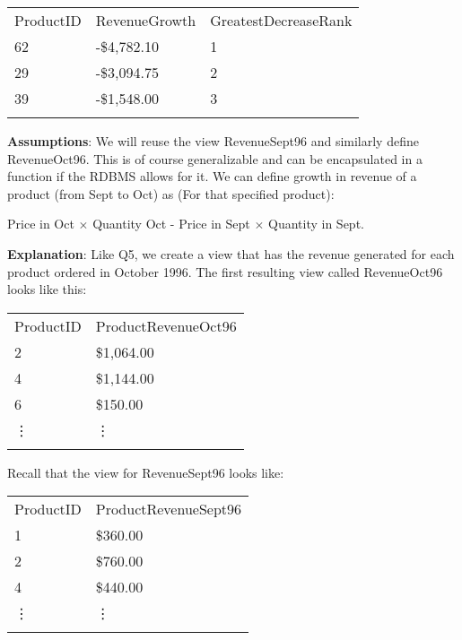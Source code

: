 \documentclass[11pt]{exam}
\newcommand{\headcol}{\rowcolor{tableheadcolor}} %
\newcommand{\topline}{\arrayrulecolor{black}\specialrule{0.1em}{\abovetopsep}{0pt}%
            \arrayrulecolor{tableheadcolor}\specialrule{\belowrulesep}{0pt}{0pt}%
            \arrayrulecolor{black}}
\newcommand{\midline}{\arrayrulecolor{tableheadcolor}\specialrule{\aboverulesep}{0pt}{0pt}%
            \arrayrulecolor{black}\specialrule{\lightrulewidth}{0pt}{0pt}%
            \arrayrulecolor{white}\specialrule{\belowrulesep}{0pt}{0pt}%
            \arrayrulecolor{black}}
\newcommand{\bottomlinec}{\arrayrulecolor{tablerowcolor}\specialrule{\aboverulesep}{0pt}{0pt}%
            \arrayrulecolor{black}\specialrule{\heavyrulewidth}{0pt}{\belowbottomsep}}%
\begin{document}
\begin{questions}
\begin{solution}
{\begin{center}
\renewcommand{\arraystretch}{1.5}
\begin{tabular}{p{2cm} p{4cm} p{4cm}}
  \topline
  \headcol ProductID & RevenueGrowth & GreatestDecreaseRank\\
  \midline
62 & -\$4,782.10 & 1\\
29 & -\$3,094.75 & 2\\
39 & -\$1,548.00 & 3\\
  \bottomlinec
\end{tabular}
\end{center}



{\bfseries Assumptions}: We will reuse the view RevenueSept96 and similarly define RevenueOct96. This is of course generalizable and can be encapsulated in a function if the RDBMS allows for it. We can define growth in revenue of a product (from Sept to Oct) as (For that specified product):

Price in Oct $\times$ Quantity Oct - Price in Sept $\times$ Quantity in Sept.

{\bfseries Explanation}: Like Q5, we create a view that has the revenue generated for each product ordered in October 1996. The first resulting view called RevenueOct96 looks like this:

\begin{center}
\renewcommand{\arraystretch}{1.5}
\begin{tabular}{p{2cm} p{4cm}}
  \topline
  \headcol ProductID & ProductRevenueOct96\\
  \midline
   2 & \$1,064.00\\
   4 & 	\$1,144.00\\
   6 & \$150.00\\
   \vdots & \vdots \\
  \bottomlinec
\end{tabular}
\end{center}

Recall that the view for RevenueSept96 looks like:

\begin{center}
\renewcommand{\arraystretch}{1.5}
\begin{tabular}{p{2cm} p{4cm}}
  \topline
  \headcol ProductID & ProductRevenueSept96\\
  \midline
   1 & \$360.00\\
   2 & 	\$760.00\\
   4 & \$440.00\\
   \vdots & \vdots \\
  \bottomlinec
\end{tabular}
\end{center}


}
\end{solution}
\end{questions}
\end{document}
